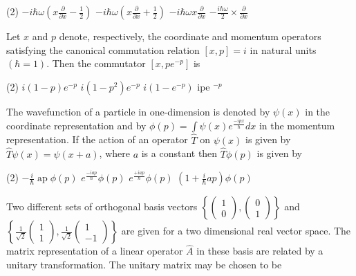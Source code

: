 \begin{enumerate}
\begin{minipage}{\textwidth}
\end{minipage}
\begin{tasks}(2)
	\task[\textbf{A.}] $-i \hbar \omega\left(x \frac{\partial}{\partial x}-\frac{1}{2}\right)$
	\task[\textbf{B.}]$-i \hbar \omega\left(x \frac{\partial}{\partial x}+\frac{1}{2}\right)$
	\task[\textbf{C.}] $-i \hbar \omega x \frac{\partial}{\partial x}$
	\task[\textbf{D.}]$-\frac{i \hbar \omega}{2} \times \frac{\partial}{\partial x}$
\end{tasks}
\begin{minipage}{\textwidth}
	\item Let $x$ and $p$ denote, respectively, the coordinate and momentum operators satisfying the canonical commutation relation $[x, p]=i$ in natural units $(\hbar=1)$. Then the commutator $\left[x, p e^{-p}\right]$ is
\end{minipage}
\begin{tasks}(2)
	\task[\textbf{A.}] $i(1-p) e^{-p}$
	\task[\textbf{B.}]$i\left(1-p^{2}\right) e^{-p}$
	\task[\textbf{C.}]$i\left(1-e^{-p}\right)$
	\task[\textbf{D.}]ipe $^{-p}$
\end{tasks}
\begin{minipage}{\textwidth}
	\item The wavefunction of a particle in one-dimension is denoted by $\psi(x)$ in the coordinate representation and by $\phi(p)=\int \psi(x) e^{\frac{-i p x}{\hbar}} d x$ in the momentum representation. If the action of an operator $\hat{T}$ on $\psi(x)$ is given by $\hat{T} \psi(x)=\psi(x+a)$, where $a$ is a constant then $\hat{T} \phi(p)$ is given by
\end{minipage}
\begin{tasks}(2)
	\task[\textbf{A.}] $-\frac{i}{\hbar} \operatorname{ap} \phi(p)$
	\task[\textbf{B.}]$e^{\frac{-i a p}{\hbar}} \phi(p)$
	\task[\textbf{C.}]$e^{\frac{+i a p}{\hbar}} \phi(p)$
	\task[\textbf{D.}]$\left(1+\frac{i}{\hbar} a p\right) \phi(p)$
\end{tasks}
\begin{minipage}{\textwidth}
	\item Two different sets of orthogonal basis vectors $\left\{\left(\begin{array}{l}1 \\ 0\end{array}\right),\left(\begin{array}{l}0 \\ 1\end{array}\right)\right\}$ and $\left\{\frac{1}{\sqrt{2}}\left(\begin{array}{l}1 \\ 1\end{array}\right), \frac{1}{\sqrt{2}}\left(\begin{array}{c}1 \\ -1\end{array}\right)\right\}$ are given for a two dimensional real vector space. The matrix representation of a linear operator $\hat{A}$ in these basis are related by a unitary transformation. The unitary matrix may be chosen to be

\end{minipage}
\end{enumerate}

